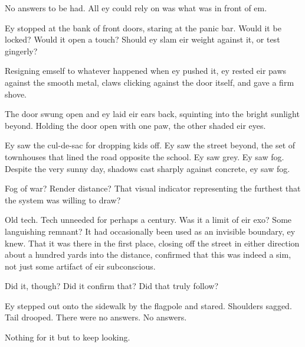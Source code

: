 No answers to be had. All ey could rely on was what was in front of em.

Ey stopped at the bank of front doors, staring at the panic bar. Would it be locked? Would it open a touch? Should ey slam eir weight against it, or test gingerly?

Resigning emself to whatever happened when ey pushed it, ey rested eir paws against the smooth metal, claws clicking against the door itself, and gave a firm shove.

The door swung open and ey laid eir ears back, squinting into the bright sunlight beyond. Holding the door open with one paw, the other shaded eir eyes.

Ey saw the cul-de-sac for dropping kids off. Ey saw the street beyond, the set of townhouses that lined the road opposite the school. Ey saw grey. Ey saw fog. Despite the very sunny day, shadows cast sharply against concrete, ey saw fog.

Fog of war? Render distance? That visual indicator representing the furthest that the system was willing to draw?

Old tech. Tech unneeded for perhaps a century. Was it a limit of eir exo? Some languishing remnant? It had occasionally been used as an invisible boundary, ey knew. That it was there in the first place, closing off the street in either direction about a hundred yards into the distance, confirmed that this was indeed a sim, not just some artifact of eir subconscious.

Did it, though? Did it confirm that? Did that truly follow?

Ey stepped out onto the sidewalk by the flagpole and stared. Shoulders sagged. Tail drooped. There were no answers. No answers.

Nothing for it but to keep looking.
